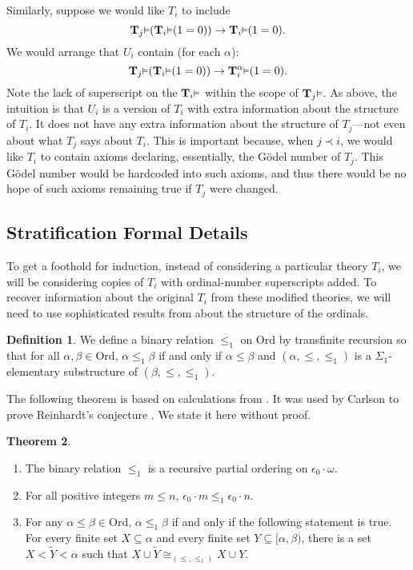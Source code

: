 \documentclass[reqno]{article}
\theoremstyle{definition}
\newtheorem{theorem}{Theorem}
\newtheorem{definition}[theorem]{Definition}
\def\T{\mathbf{T}}
\def\epom{\epsilon_0\cdot\omega}
\renewcommand{\Pr}[1]{\T_{#1}\mbox{\small${\vDash}$}}
\newcommand{\Prr}[2]{\T^{#1}_{#2}\mbox{\small${\vDash}$}}
\begin{document}
Similarly, suppose we would like $T_i$ to include
\[
\Pr j(\Pr i (1=0))\rightarrow \Pr i(1=0).
\]
We would arrange that $U_i$ contain
(for each $\alpha$):
\[
\Pr j(\Pr i(1=0))\rightarrow \Prr {\alpha} i(1=0).
\]
Note the lack of superscript on the $\Pr i$ within the scope of $\Pr j$.
As above, the intuition is that $U_i$
is a version of $T_i$ with extra information about the structure of
$T_i$. It does not have any extra information about the
structure of $T_j$---not even about what $T_j$ says about $T_i$.
This is important because, when $j\prec i$, we would like $T_i$ to
contain axioms declaring, essentially, the G\"odel number of
$T_j$. This G\"odel number would be hardcoded into such axioms,
and thus there would be no hope of such axioms remaining true if
$T_j$ were changed.

\subsection{Stratification Formal Details}
\label{StratificationDetailsSection}

To get a foothold for induction, instead of considering a particular theory
$T_i$, we will be considering
copies of $T_i$ with ordinal-number superscripts added.
To recover information about the original $T_i$ from these
modified theories, we will need to use sophisticated results
from \cite{carlson1999} about the structure of the ordinals.

\begin{definition}
We define a binary relation $\leq_1$ on $\mathrm{Ord}$ by transfinite recursion
so that for all $\alpha,\beta\in\mathrm{Ord}$, $\alpha\leq_1\beta$ if and only if
$\alpha\leq\beta$ and $(\alpha,\leq,\leq_1)$ is a $\Sigma_1$-elementary substructure
of $(\beta,\leq,\leq_1)$.
\end{definition}

The following theorem is based on calculations from \cite{carlson1999}.
It was used by Carlson to prove Reinhardt's conjecture \cite{carlson2000}.
We state it here without proof.


\begin{theorem}
\label{blackbox}
\item
\begin{enumerate}
\item The binary relation $\leq_1$ is a recursive partial ordering on $\epom$.
\item For all positive integers $m\leq n$, $\epsilon_0\cdot m\leq_1\epsilon_0\cdot n$.
\item For any $\alpha\leq\beta\in\mathrm{Ord}$, $\alpha\leq_1\beta$ if and only if
the following statement is true.  For every finite set $X\subseteq\alpha$
and every finite set $Y\subseteq[\alpha,\beta)$, there is a set
$X<\widetilde Y<\alpha$ such that $X\cup\widetilde Y\cong_{(\leq,\leq_1)}X\cup Y$.
\end{enumerate}
\end{theorem}
\end{document}
